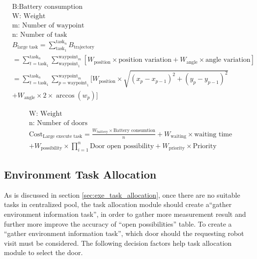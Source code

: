 \begin{equation}
\begin{aligned}
\label{eq:battery_consumption}
& \mbox{B:Battery consumption } \\
& \mbox{W: Weight } \\
& \mbox{m: Number of waypoint } \\
& \mbox{n: Number of task} \\
& B_{\mbox{large task}} = \sum_{\mbox{task}_1}^{\mbox{task}_n} B_{\mbox{trajectory}} \\
& = \sum_{t = \mbox{task}_1}^{\mbox{task}_n} \sum_{\mbox{waypoint}_1}^{\mbox{waypoint}_m} [W_{\mbox{position}} \times \mbox{position variation}+W_{\mbox{angle}}  \times \mbox{angle variation}]\\
& = \sum_{t = \mbox{task}_1}^{\mbox{task}_n} \sum_{p = \mbox{waypoint}_1}^{\mbox{waypoint}_m} [ W_{\mbox{position}} \times \sqrt{(x_p-x_{p-1} )^2+(y_p-y_{p-1} )^2} \\
&   + W_{\mbox{angle}} \times 2 \times \arccos(w_p)] 
\end{aligned}
\end{equation}


\begin{equation}
	\label{eq:large_execute_task_cost} 
	\begin{aligned}
	& \mbox{W: Weight } \\
	& \mbox{n: Number of doors} \\
	& \mbox{Cost}_{\mbox{Large execute task}} = \frac{W_{\mbox{battery}} \times \mbox{Battery consumtion}}{n} + W_{\mbox{waiting}} \times \mbox{waiting time} \\
	& + W_{\mbox{possibility}} \times \prod\limits_{i=1}^n \mbox{Door open possibility}  + W_{\mbox{priority}} \times \mbox{Priority}
	\end{aligned}
\end{equation}


\subsection{Environment Task Allocation}
As is discussed in section \ref{sec:exe_task_allocation}, once there are no suitable tasks in centralized pool, the task allocation module should create a``gather environment information task'', in order to gather more measurement result and further more improve the accuracy of ``open possibilities'' table.
To create a ``gather environment information task'', which door should the requesting robot visit must be considered. The following decision factors help task allocation module to select the door.

